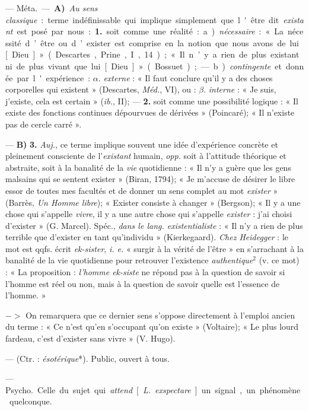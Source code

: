 \begin{itemize}[leftmargin=1cm, label=, itemsep=1pt]
 — \si{Méta.} — {\bf A)} {\it Au sens classique} :
terme indéfinissable qui implique simplement que l'être dit
{\it existant} est posé par nous : {\bf 1.} soit
comme une réalité : a) {\it nécessaire} :
« La nécessité d’être ou d’exister est
comprise en la notion que nous
avons de lui [Dieu] » (Descartes,
Prine., I, 14) ; « Il n’y a rien de plus
existant ni de plus vivant que lui
[Dieu] » (Bossuet); — b) {\it contingente}
et donnée par l'expérience : $\alpha$. {\it externe} : « Il faut conclure
qu'il y a des choses corporelles qui existent » (Descartes, \si{{\it Méd.}},
VI), ou : $\beta$. {\it interne} : « Je suis, j'existe, cela est
certain » ({\it ib.}, II); — {\bf 2.} soit comme
une possibilité logique : « Il existe
des fonctions continues dépourvues
de dérivées » (Poincaré); « Il n'existe
pas de cercle carré ».

— {\bf B)} {\bf 3.} {\it Auj.}, ce terme implique
souvent une idée d’expérience concrète et pleinement consciente de
l'{\it existant} humain, {\it opp.} soit à l’attitude théorique et
abstraite, soit à la banalité de la {\it vie} quotidienne :
« Il n’y a guère que les gens malsains
qui se sentent exister » (Biran,
1794); « Je m’accuse de désirer le
libre essor de toutes mes facultés et
de donner un sens complet au mot
{\it exister} » (Barrès, {\it Un Homme libre});
« Exister consiste à changer »
(Bergson); « Il y a une chose qui
s'appelle {\it vivre}, il y a une autre chose
qui s'appelle {\it exister} : j'ai choisi
d'exister » (G. Marcel). Spéc., {\it dans
le lang. existentialiste} : « Il n'y a
rien de plus terrible que d’exister
en tant qu'individu » (Kierkegaard).
{\it Chez Heidegger} : le mot est qqfs.
écrit {\it ek-sister}, {\it i. e.} « surgir à la vérité
de l'être » en s’arrachant à la banalité de la vie quotidienne pour
retrouver l'existence {\it authentique}$^2$ (v.
ce mot) : « La proposition : {\it l’homme
ek-siste} ne répond pas à la question
de savoir si l'homme est réel ou non,
mais à la question de savoir quelle
est l’essence de l’homme. »

$->$ On remarquera que ce dernier sens s'oppose directement à
l'emploi ancien du terme : « Ce n’est
qu'en s'occupant qu'on existe »
(Voltaire); « Le plus lourd fardeau,
c’est d'exister sans vivre » (V. Hugo).

 — (Ctr. : {\it ésotérique}*).
Public, ouvert à tous.

 — \si{Psycho.}
Celle du sujet qui {\it attend} [{\it L.} {\it exspectare}] un signal,
un phénomène quelconque.


\end{itemize}
